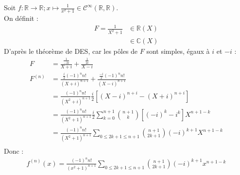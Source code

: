 \documentclass[../main.tex]{subfiles}
\begin{document}
\noindent Soit $f:\mathbb{R}\to \mathbb{R}; x\mapsto \frac{1}{x^2 + 1} \in \mathcal{C}^{\infty}(\mathbb{R}, \mathbb{R})$. \\
On définit : 
\begin{align*}
    F = \frac{1}{X^2 + 1} &\in \mathbb{R}(X) \\
    &\in \mathbb{C}(X) 
\end{align*}
D'après le théorème de DES, car les pôles de $F$ sont simples, égaux à $i$ et $-i$ : 
\begin{align*}
    F &= \frac{\frac{1}{-2i}}{X+i} + \frac{\frac{1}{2i}}{X-i} \\
    F^{(n)} &= \frac{\frac{i}{2}(-1)^n n!}{(X+i)^{n+1}} + \frac{\frac{-i}{2}(-1)^n n!}{(X-i)^{n+1}} \\
    &= \frac{(-1)^n n!}{(X^2 + i)^{n+1}} \frac{i}{2} \left[ (X-i)^{n+i} - (X+i)^{n+i} \right] \\
    &= \frac{(-1)^n n!}{(X^2 + 1)^{n+1}} \frac{i}{2} \sum_{k=0}^{n+1} \binom{n+1}{k} [(-i)^k - i^k] X^{n+1-k} \\
    &= \frac{(-1)^n n!}{(X^2 + 1)^{n+1}} \sum_{0 \leq 2k + 1 \leq n+1} \binom{n+1}{2k+1} (-i)^{k+1} X^{n+1-k} \\
\end{align*}
Donc : 
\begin{align*}
    f^{(n)}(x) = \frac{(-1)^n n!}{(x^2 + 1)^{n+1}} \sum_{0 \leq 2k + 1 \leq n+1} \binom{n+1}{2k+1} (-i)^{k+1} x^{n+1-k}	
\end{align*}
\end{document}

